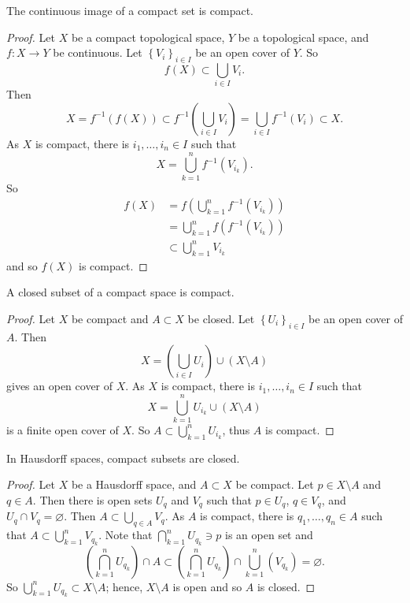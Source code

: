 \begin{proposition}[]
	The continuous image of a compact set is compact.
\end{proposition}

\begin{proof}
	Let $X$ be a compact topological space, $Y$ be a topological space,
	and $f: X \to Y$ be continuous.
	Let
	$
		\left\{
			V_i
		\right\}_{i \in I}
	$
	be an open cover of $Y$. So
	\[
		f(X) \subset \bigcup_{i \in I} V_i.
	\]
	Then
	\[
		X
		= f^{-1}(f(X))
		\subset f^{-1} \left( 
			\bigcup_{i \in I} V_i 
		\right)
		= \bigcup_{i \in I} f^{-1}(V_i)
		\subset X.
	\]
	As $X$ is compact, there is 
	$i_1, \ldots, i_n \in I$
	such that
	\[
		X = \bigcup_{k=1}^n f^{-1}\left( 
			V_{i_k} 
		\right).
	\]
	So
	\begin{align*}
		f(X)
		&= f\left( 
			\bigcup_{k=1}^n f^{-1}(V_{i_k})
		\right) \\
		&= \bigcup_{k=1}^n f(f^{-1}(V_{i_k})) \\
		&\subset \bigcup_{k=1}^n V_{i_k}
	\end{align*}
	and so $f(X)$ is compact.
\end{proof}

\begin{proposition}[]
	A closed subset of a compact space is compact.
\end{proposition}

\begin{proof}
	Let $X$ be compact and $A \subset X$ be closed.
	Let 
	$
		\left\{
			U_i
		\right\}_{i \in I}
	$
	be an open cover of $A$.
	Then
	\[
		X = \left( 
			\bigcup_{i \in I} U_i 
		\right) \cup \left( 
			X \setminus A 
		\right)
	\]
	gives an open cover of $X$.
	As $X$ is compact, there is 
	$i_1, \ldots, i_n \in I$
	such that
	\[
		X = \bigcup_{k=1}^n U_{i_k} \cup (X \setminus A)
	\]
	is a finite open cover of $X$.
	So $A \subset \bigcup_{k=1}^n U_{i_k}$,
	thus $A$ is compact.
\end{proof}

\begin{theorem}[]
	In Hausdorff spaces, compact subsets are closed.
\end{theorem}

\begin{proof}
	Let $X$ be a Hausdorff space, and $A \subset X$ be compact.
	Let $p \in X \setminus A$ and $q \in A$.
	Then there is open sets $U_q$ and $V_q$ such that
	$p \in U_q$, $q \in V_q$, and $U_q \cap V_q = \varnothing$.
	Then
	$
		A \subset \bigcup_{q \in A} V_q.
	$
	As $A$ is compact,
	there is $q_1, \ldots, q_n \in A$ such that
	$
		A \subset \bigcup_{k=1}^n V_{q_k}
	$.
	Note that 
	$\bigcap_{k=1}^n U_{q_k} \ni p$ 
	is an open set and
	\[
		\left(
			\bigcap_{k=1}^n U_{q_k}
		\right) \cap A
		\subset \left( 
			\bigcap_{k=1}^n U_{q_k} 
		\right) \cap \bigcup_{k=1}^n \left( 
			V_{q_k} 
		\right)
		= \varnothing.
	\]
	So $\bigcup_{k=1}^n U_{q_k} \subset X \setminus A$;
	hence, $X \setminus A$ is open and so $A$ is closed.
\end{proof}

